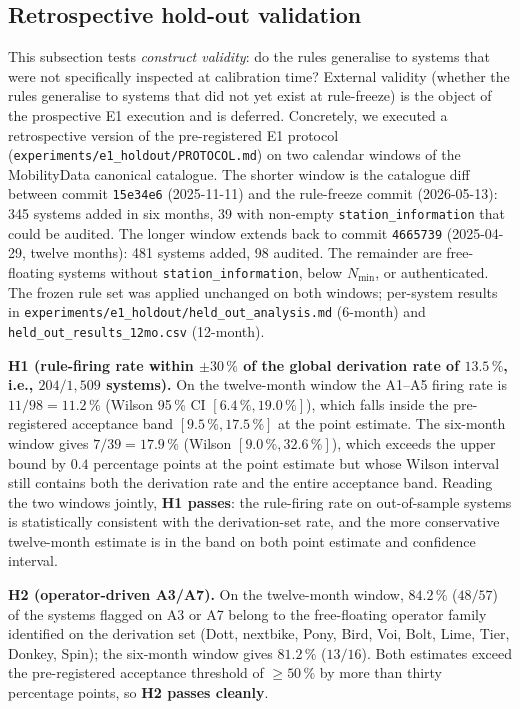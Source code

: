 \documentclass[11pt,a4paper]{article}
\begin{document}
\subsection{Retrospective hold-out validation}
\label{secHoldoutValidation}
This subsection tests \emph{construct validity}: do the rules
generalise to systems that were not specifically inspected at
calibration time? External validity (whether the rules generalise
to systems that did not yet exist at rule-freeze) is the object
of the prospective E1 execution and is deferred. Concretely, we
executed a retrospective version of the pre-registered E1
protocol (\texttt{experiments/e1\_holdout/PROTOCOL.md}) on two
calendar windows of the MobilityData canonical catalogue. The
shorter window is the catalogue diff between commit
\texttt{15e34e6} (2025-11-11) and the rule-freeze commit
(2026-05-13): 345 systems added in six months, 39 with non-empty
\texttt{station\_information} that could be audited. The longer
window extends back to commit \texttt{4665739} (2025-04-29,
twelve months): 481 systems added, 98 audited. The remainder
are free-floating systems without \texttt{station\_information},
below $N_{\min}$, or authenticated. The frozen rule set was
applied unchanged on both windows; per-system results in
\texttt{experiments/e1\_holdout/held\_out\_analysis.md} (6-month)
and \texttt{held\_out\_results\_12mo.csv} (12-month).

\textbf{H1 (rule-firing rate within $\pm 30\,\%$ of the
global derivation rate of $13.5\,\%$, i.e., $204/1{,}509$
systems).} On the twelve-month window the
A1--A5 firing rate is $11/98 = 11.2\,\%$ (Wilson 95\,\% CI
$[6.4\,\%, 19.0\,\%]$), which falls inside the pre-registered
acceptance band $[9.5\,\%, 17.5\,\%]$ at the point estimate.
The six-month window gives $7/39 = 17.9\,\%$ (Wilson
$[9.0\,\%, 32.6\,\%]$), which exceeds the upper bound by
$0.4$ percentage points at the point estimate but whose Wilson
interval still contains both the derivation rate and the entire
acceptance band. Reading the two windows jointly,
\textbf{H1 passes}: the rule-firing rate on out-of-sample
systems is statistically consistent with the derivation-set
rate, and the more conservative twelve-month estimate is in
the band on both point estimate and confidence interval.

\textbf{H2 (operator-driven A3/A7).} On the twelve-month window,
$84.2\,\%$ ($48/57$) of the systems flagged on A3 or A7 belong
to the free-floating operator family identified on the
derivation set (Dott, nextbike, Pony, Bird, Voi, Bolt, Lime,
Tier, Donkey, Spin); the six-month window gives $81.2\,\%$
($13/16$). Both estimates exceed the pre-registered acceptance
threshold of $\geq 50\,\%$ by more than thirty percentage
points, so \textbf{H2 passes cleanly}.
\end{document}
